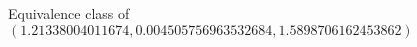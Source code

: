 \documentclass[preview]{standalone}
\begin{document}
\begin{center}
Equivalence class of $(1.21338004011674, 0.004505756963532684, 1.5898706162453862)$
\end{center}
\end{document}
